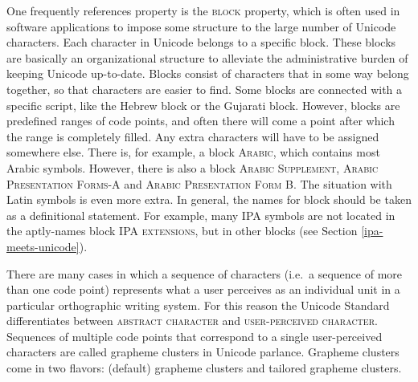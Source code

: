 One frequently references property is the \textsc{block} property, which is
often used in software applications to impose some structure to the large number
of Unicode characters. Each character in Unicode belongs to a specific block.
These blocks are basically an organizational structure to alleviate the
administrative burden of keeping Unicode up-to-date. Blocks consist of
characters that in some way belong together, so that characters are easier to
find. Some blocks are connected with a specific script, like the Hebrew block or
the Gujarati block. However, blocks are predefined ranges of code points, and
often there will come a point after which the range is completely filled. Any
extra characters will have to be assigned somewhere else. There is, for example,
a block \textsc{Arabic}, which contains most Arabic symbols. However, there is
also a block \textsc{Arabic Supplement}, \textsc{Arabic Presentation Forms-A}
and \textsc{Arabic Presentation Form B}. The situation with Latin symbols is
even more extra. In general, the names for block should be taken as a
definitional statement. For example, many IPA symbols are not located in the
aptly-names block \textsc{IPA extensions}, but in other blocks (see Section
\ref{ipa-meets-unicode}).

There are many cases in which a sequence of characters (i.e.~a sequence of more
than one code point) represents what a user perceives as an individual unit in a
particular orthographic writing system. For this reason the Unicode Standard
differentiates between \textsc{abstract character} and \textsc{user-perceived
character}. Sequences of multiple code points that correspond to a single
user-perceived characters are called grapheme clusters in Unicode parlance.
Grapheme clusters come in two flavors: (default) grapheme clusters and tailored
grapheme clusters.

